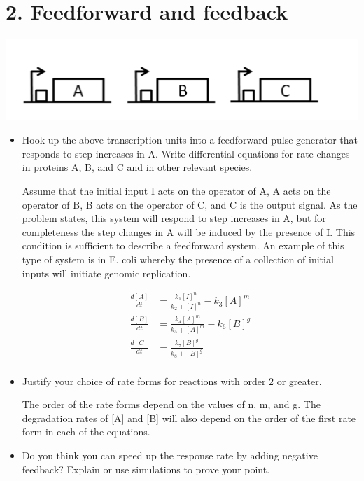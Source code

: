 \documentclass[11pt]{article}
\begin{document}
\section*{2. Feedforward and feedback}


{\centering
  \includegraphics[scale=0.75, trim = 0mm 0mm 7mm 0mm, clip]{ps3_q2.png}\par
 }
\begin{itemize}
\item[] Hook up the above transcription units into a feedforward pulse generator that responds to step increases in A. 
Write differential equations for rate changes in proteins A, B, and C and in other relevant species. 

Assume that the initial input I acts on the operator of A, A acts on the operator of B, B acts on the operator of C, and
C is the output signal. 
As the problem states, this system will respond to step increases in A, but for completeness 
the step changes in A will be induced by the presence of I.  
This condition is sufficient to describe a feedforward system. An example of this type of system is in 
E. coli whereby the presence of a collection of initial inputs will initiate genomic replication.  

\begin{equation*}
  \begin{align}
    \frac{d[A]}{dt} &= \frac{k_1[I]^n}{k_2+[I]^n} - k_3[A]^m\\
    \frac{d[B]}{dt} &= \frac{k_4[A]^m}{k_5+[A]^m} - k_6[B]^g\\
    \frac{d[C]}{dt} &= \frac{k_7[B]^g}{k_8+[B]^g}\\
  \end{align}
\end{equation*}

\item[] Justify your choice of rate forms for reactions with order 2 or greater. 

The order of the rate forms depend on the values of n, m, and g. The degradation rates of [A] and [B] will also
depend on the order of the first rate form in each of the equations. 

\item[] Do you think you can speed up the response rate by adding negative feedback? Explain or use simulations to prove your point. 


\end{itemize}
\end{document}
